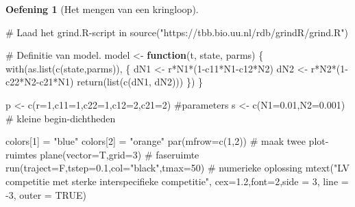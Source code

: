 \documentclass[
  a4paper,
]{scrbook}
\newenvironment{Shaded}{\begin{snugshade}}{\end{snugshade}}
\newcommand{\AttributeTok}[1]{\textcolor[rgb]{0.40,0.45,0.13}{#1}}
\newcommand{\CommentTok}[1]{\textcolor[rgb]{0.37,0.37,0.37}{#1}}
\newcommand{\ConstantTok}[1]{\textcolor[rgb]{0.56,0.35,0.01}{#1}}
\newcommand{\ControlFlowTok}[1]{\textcolor[rgb]{0.00,0.23,0.31}{\textbf{#1}}}
\newcommand{\DecValTok}[1]{\textcolor[rgb]{0.68,0.00,0.00}{#1}}
\newcommand{\FloatTok}[1]{\textcolor[rgb]{0.68,0.00,0.00}{#1}}
\newcommand{\FunctionTok}[1]{\textcolor[rgb]{0.28,0.35,0.67}{#1}}
\newcommand{\NormalTok}[1]{\textcolor[rgb]{0.00,0.23,0.31}{#1}}
\newcommand{\OtherTok}[1]{\textcolor[rgb]{0.00,0.23,0.31}{#1}}
\newcommand{\SpecialCharTok}[1]{\textcolor[rgb]{0.37,0.37,0.37}{#1}}
\newcommand{\StringTok}[1]{\textcolor[rgb]{0.13,0.47,0.30}{#1}}
\theoremstyle{definition}
\newtheorem{exercise}{Oefening}[chapter]
\theoremstyle{remark}
\begin{document}
\begin{exercise}[Het mengen van een
kringloop]
\begin{Shaded}
\begin{Highlighting}[]
\CommentTok{\# Laad het grind.R{-}script in}
\FunctionTok{source}\NormalTok{(}\StringTok{"https://tbb.bio.uu.nl/rdb/grindR/grind.R"}\NormalTok{)}

\CommentTok{\# Definitie van model. }
\NormalTok{model }\OtherTok{\textless{}{-}} \ControlFlowTok{function}\NormalTok{(t, state, parms) \{}
  \FunctionTok{with}\NormalTok{(}\FunctionTok{as.list}\NormalTok{(}\FunctionTok{c}\NormalTok{(state,parms)), \{}
\NormalTok{    dN1 }\OtherTok{\textless{}{-}}\NormalTok{ r}\SpecialCharTok{*}\NormalTok{N1}\SpecialCharTok{*}\NormalTok{(}\DecValTok{1}\SpecialCharTok{{-}}\NormalTok{c11}\SpecialCharTok{*}\NormalTok{N1}\SpecialCharTok{{-}}\NormalTok{c12}\SpecialCharTok{*}\NormalTok{N2)}
\NormalTok{    dN2 }\OtherTok{\textless{}{-}}\NormalTok{ r}\SpecialCharTok{*}\NormalTok{N2}\SpecialCharTok{*}\NormalTok{(}\DecValTok{1}\SpecialCharTok{{-}}\NormalTok{c22}\SpecialCharTok{*}\NormalTok{N2}\SpecialCharTok{{-}}\NormalTok{c21}\SpecialCharTok{*}\NormalTok{N1)}
    \FunctionTok{return}\NormalTok{(}\FunctionTok{list}\NormalTok{(}\FunctionTok{c}\NormalTok{(dN1, dN2)))  }
\NormalTok{  \}) }
\NormalTok{\}  }


\NormalTok{p }\OtherTok{\textless{}{-}} \FunctionTok{c}\NormalTok{(}\AttributeTok{r=}\DecValTok{1}\NormalTok{,}\AttributeTok{c11=}\DecValTok{1}\NormalTok{,}\AttributeTok{c22=}\DecValTok{1}\NormalTok{,}\AttributeTok{c12=}\DecValTok{2}\NormalTok{,}\AttributeTok{c21=}\DecValTok{2}\NormalTok{)  }\CommentTok{\#parameters}
\NormalTok{s }\OtherTok{\textless{}{-}} \FunctionTok{c}\NormalTok{(}\AttributeTok{N1=}\FloatTok{0.01}\NormalTok{,}\AttributeTok{N2=}\FloatTok{0.001}\NormalTok{) }\CommentTok{\# kleine begin{-}dichtheden}

\NormalTok{colors[}\DecValTok{1}\NormalTok{] }\OtherTok{=} \StringTok{"blue"}
\NormalTok{colors[}\DecValTok{2}\NormalTok{] }\OtherTok{=} \StringTok{"orange"}
\FunctionTok{par}\NormalTok{(}\AttributeTok{mfrow=}\FunctionTok{c}\NormalTok{(}\DecValTok{1}\NormalTok{,}\DecValTok{2}\NormalTok{)) }\CommentTok{\# maak twee plot{-}ruimtes}
\FunctionTok{plane}\NormalTok{(}\AttributeTok{vector=}\NormalTok{T,}\AttributeTok{grid=}\DecValTok{3}\NormalTok{) }\CommentTok{\# faseruimte }
\FunctionTok{run}\NormalTok{(}\AttributeTok{traject=}\NormalTok{F,}\AttributeTok{tstep=}\FloatTok{0.1}\NormalTok{,}\AttributeTok{col=}\StringTok{"black"}\NormalTok{,}\AttributeTok{tmax=}\DecValTok{50}\NormalTok{) }\CommentTok{\# numerieke oplossing}
\FunctionTok{mtext}\NormalTok{(}\StringTok{"LV competitie met sterke interspecifieke competitie"}\NormalTok{, }\AttributeTok{cex=}\FloatTok{1.2}\NormalTok{,}\AttributeTok{font=}\DecValTok{2}\NormalTok{,}\AttributeTok{side =} \DecValTok{3}\NormalTok{, }\AttributeTok{line =} \SpecialCharTok{{-}}\DecValTok{3}\NormalTok{, }\AttributeTok{outer =} \ConstantTok{TRUE}\NormalTok{)}
\end{Highlighting}
\end{Shaded}


\end{exercise}
\end{document}

